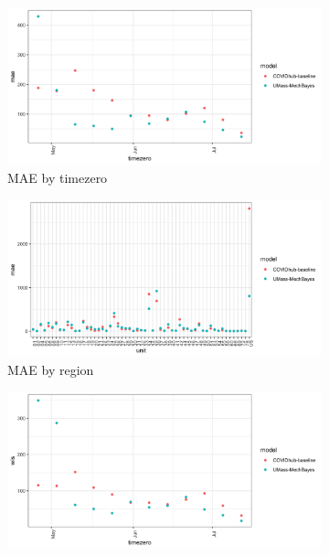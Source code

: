 \documentclass[11pt]{amsart}
\begin{document}
\begin{figure}
  \centering
     \begin{subfigure}{.5\textwidth}
  \centering
    \includegraphics[scale=.1]{mae_results_by_time_zero.png}
    \caption{MAE by timezero}
\end{subfigure}%
\begin{subfigure}{.5\textwidth}
  \centering
    \includegraphics[scale=.1]{mae_results_by_region.png}
    \caption{MAE by region}
\end{subfigure}
\begin{subfigure}{.5\textwidth}
  \centering
    \includegraphics[scale=.1]{wis_results_by_time_zero.png}

\end{subfigure}
\end{figure}
\end{document}

